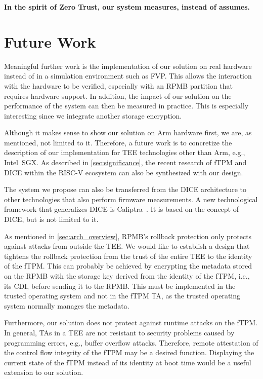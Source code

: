 \textbf{In the spirit of Zero Trust, our system measures, instead of assumes.}

\section{Future Work}

Meaningful further work is the implementation of our solution on real hardware instead of in a simulation environment such as FVP\@.
This allows the interaction with the hardware to be verified, especially with an RPMB partition that requires hardware support.
In addition, the impact of our solution on the performance of the system can then be measured in practice.
This is especially interesting since we integrate another storage encryption.

Although it makes sense to show our solution on Arm hardware first, we are, as mentioned, not limited to it.
Therefore, a future work is to concretize the description of our implementation for TEE technologies other than Arm, e.g., Intel~SGX\@.
As described in \autoref{sec:significance}, the recent research of \ac{fTPM} and \ac{DICE} within the RISC-V ecosystem can also be synthesized with our design.

The system we propose can also be transferred from the \ac{DICE} architecture to other technologies that also perform firmware measurements.
A new technological framework that generalizes \ac{DICE} is Caliptra~\cite{caliptra}.
It is based on the concept of \ac{DICE}, but is not limited to it.

As mentioned in \autoref{sec:arch_overview}, RPMB's rollback protection only protects against attacks from outside the TEE\@.
We would like to establish a design that tightens the rollback protection from the trust of the entire TEE to the identity of the fTPM\@.
This can probably be achieved by encrypting the metadata stored on the RPMB with the storage key derived from the identity of the fTPM, i.e., its CDI, before sending it to the RPMB\@.
This must be implemented in the trusted operating system and not in the fTPM TA, as the trusted operating system normally manages the metadata.

Furthermore, our solution does not protect against runtime attacks on the fTPM\@.
In general, \acp{TA} in a \ac{TEE} are not resistant to security problems caused by programming errors, e.g., buffer overflow attacks.
Therefore, remote attestation of the control flow integrity of the fTPM may be a desired function.
Displaying the current state of the fTPM instead of its identity at boot time would be a useful extension to our solution.


